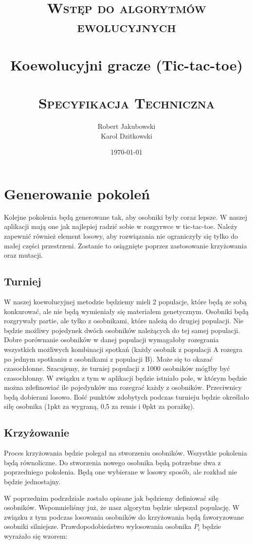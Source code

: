 \documentclass[paper=a4, fontsize=11pt]{scrartcl} %
\title{
\vspace*{\fill}
\normalfont
\textsc{Wstęp do algorytmów ewolucyjnych}\\ [20pt]
\horrule{1.5pt} \\[0.4cm] %
\LARGE Koewolucyjni gracze (Tic-tac-toe)\\ %
\horrule{1.5pt} \\[0.1cm] %
\normalsize
\textsc{Specyfikacja Techniczna} \\ [20pt]
\vspace*{\fill}
}
\author{Robert Jakubowski \\Karol Dzitkowski} %
\date{\normalsize\today} %
\numberwithin{equation}{section} %
\numberwithin{figure}{section} %
\numberwithin{table}{section} %
\begin{document}
\maketitle

\thispagestyle{empty}
\clearpage

\tableofcontents

\clearpage

\section{Generowanie pokoleń}
Kolejne pokolenia będą generowane tak, aby osobniki były coraz lepsze. W naszej aplikacji mają one jak najlepiej radzić sobie w rozgyrwce w tic-tac-toe. Należy zapewnić również element losowy, aby rozwiązania nie ograniczyły się tylko do małej części przestrzeni. Zostanie to osiągnięte poprzez zastosowanie krzyżowania oraz mutacji. 

\subsection{Turniej}
W naszej koewolucyjnej metodzie będziemy mieli 2 populacje, które będą ze sobą konkurować, ale nie będą wymieniały się materiałem genetycznym. Osobniki będą rozgrywały partie, ale tylko z osobnikami, które należą do drugiej populacji. Nie będzie możliwy pojedynek dwóch osobników należących do tej samej populacji. Dobre porównanie osobników w danej populacji wymagałoby rozegrania wszystkich możliwych kombinacji spotkań (każdy osobnik z populacji A rozegra po jednym spotkaniu z osobnikami z populacji B). Może się to okazać czasochłonne. Szacujemy, że turniej populacji z 1000 osobników mógłby być czasochłonny. W związku z tym w aplikacji będzie istniało pole, w którym będzie można zdefinowiać ile pojedynków ma rozegrać każdy z osobników. Przeciwnicy będą dobierani losowo. Ilość punktów zdobytych podczas turnieju będzie określało siłę osobnika (1pkt za wygraną, 0,5 za remis i 0pkt za porażkę).

\subsection{Krzyżowanie}
Proces krzyżowania będzie polegał na stworzeniu osobników. Wszystkie pokolenia będą równoliczne. Do stworzenia nowego osobnika będą potrzebne dwa z poprzedniego pokolenia. Będą one wybierane w losowy sposób, ale rozkład nie będzie jednostajny.

W poprzednim podrzdziale zostało opisane jak będziemy definiować siłę osobników. Wspomnieliśmy już, że nasz algorytm będzie ulepszał populację. W związku z tym podczas losowania osobników do krzyżowania będą faworyzowane osobniki silniejsze. Prawdopodobieństwo wylosowania osobnika ${P_i}$ będzie wyrażało się wzorem:
\end{document}
